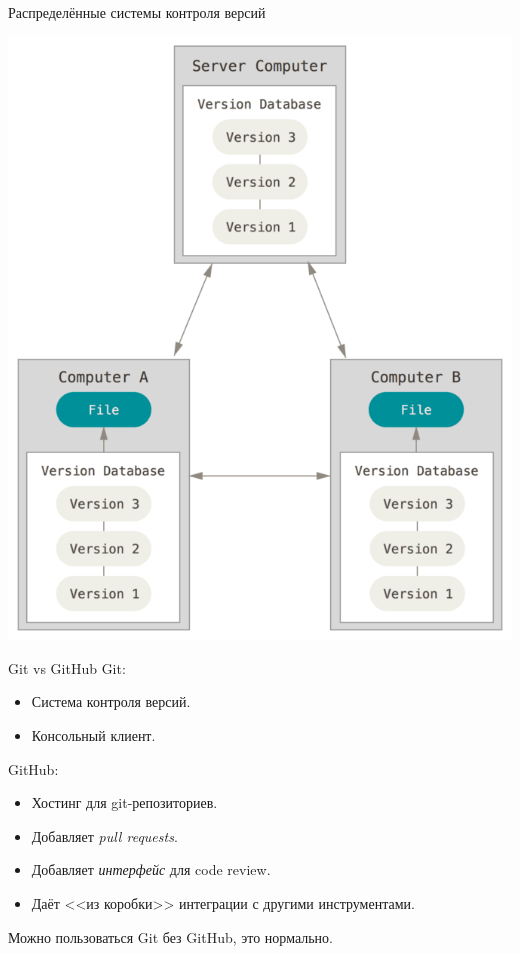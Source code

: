 \begin{frame}[t]{Распределённые системы контроля версий}
\begin{center}
\includegraphics[height=0.8\textheight,keepaspectratio]{distributed.png}
\end{center}
\end{frame}

\begin{frame}[t]{Git vs GitHub}
Git:
\begin{itemize}
\item Система контроля версий.
\item Консольный клиент.
\end{itemize}
GitHub:
\begin{itemize}
\item Хостинг для git-репозиториев.
\item Добавляет \textit{pull requests}.
\item Добавляет \textit{интерфейс} для code review.
\item Даёт <<из коробки>> интеграции с другими инструментами.
\end{itemize}
Можно пользоваться Git без GitHub, это нормально.
\end{frame}

